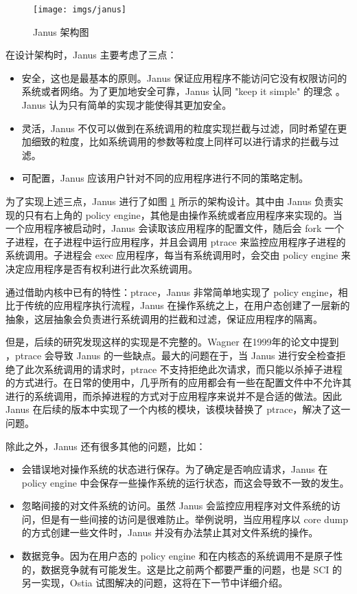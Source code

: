 \begin{figure}[!htp]
  \centering
  \texttt{[image: imgs/janus]}
  \caption{Janus 架构图}
  \label{fig:janus}
\end{figure}

在设计架构时，Janus 主要考虑了三点：

\begin{itemize}
\item
安全，这也是最基本的原则。Janus 保证应用程序不能访问它没有权限访问的系统或者网络。为了更加地安全可靠，Janus 认同 "keep it simple" 的理念 \parencite{keepitsimple}。Janus 认为只有简单的实现才能使得其更加安全。
\item
灵活，Janus 不仅可以做到在系统调用的粒度实现拦截与过滤，同时希望在更加细致的粒度，比如系统调用的参数等粒度上同样可以进行请求的拦截与过滤。
\item
可配置，Janus 应该用户针对不同的应用程序进行不同的策略定制。
\end{itemize}

为了实现上述三点，Janus 进行了如图 \ref{fig:janus} 所示的架构设计。其中由 Janus 负责实现的只有右上角的 policy engine，其他是由操作系统或者应用程序来实现的。当一个应用程序被启动时，Janus 会读取该应用程序的配置文件，随后会 fork 一个子进程，在子进程中运行应用程序，并且会调用 ptrace 来监控应用程序子进程的系统调用。子进程会 exec 应用程序，每当有系统调用时，会交由 policy engine 来决定应用程序是否有权利进行此次系统调用。

通过借助内核中已有的特性：ptrace，Janus 非常简单地实现了 policy engine，相比于传统的应用程序执行流程，Janus 在操作系统之上，在用户态创建了一层新的抽象，这层抽象会负责进行系统调用的拦截和过滤，保证应用程序的隔离。

但是，后续的研究发现这样的实现是不完整的。Wagner 在1999年的论文中提到 \parencite{wagner1999janus}，ptrace 会导致 Janus 的一些缺点。最大的问题在于，当 Janus 进行安全检查拒绝了此次系统调用的请求时，ptrace 不支持拒绝此次请求，而只能以杀掉子进程的方式进行。在日常的使用中，几乎所有的应用都会有一些在配置文件中不允许其进行的系统调用，而杀掉进程的方式对于应用程序来说并不是合适的做法。因此 Janus 在后续的版本中实现了一个内核的模块，该模块替换了 ptrace，解决了这一问题。

除此之外，Janus 还有很多其他的问题，比如：

\begin{itemize}
\item
会错误地对操作系统的状态进行保存。为了确定是否响应请求，Janus 在 policy engine 中会保存一些操作系统的运行状态，而这会导致不一致的发生。
\item
忽略间接的对文件系统的访问。虽然 Janus 会监控应用程序对文件系统的访问，但是有一些间接的访问是很难防止。举例说明，当应用程序以 core dump 的方式创建一些文件时，Janus 并没有办法禁止其对文件系统的操作。
\item
数据竞争。因为在用户态的 policy engine 和在内核态的系统调用不是原子性的，数据竞争就有可能发生。这是比之前两个都要严重的问题，也是 SCI 的另一实现，Ostia 试图解决的问题\parencite{garfinkel2003traps}，这将在下一节中详细介绍。
\end{itemize}

